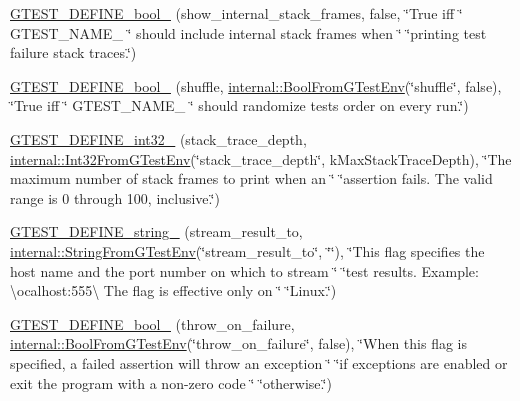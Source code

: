 \begin{DoxyCompactItemize}
\item 
\hyperlink{namespacetesting_a60ef38aa9d1437f0d7818181897af8ef}{G\+T\+E\+S\+T\+\_\+\+D\+E\+F\+I\+N\+E\+\_\+bool\+\_\+} (show\+\_\+internal\+\_\+stack\+\_\+frames, false, \char`\"{}True iff \char`\"{} G\+T\+E\+S\+T\+\_\+\+N\+A\+M\+E\+\_\+ \char`\"{} should include internal stack frames when \char`\"{} \char`\"{}printing test failure stack traces.\char`\"{})
\item 
\hyperlink{namespacetesting_af95276e3deb9d243d729f3043eabd272}{G\+T\+E\+S\+T\+\_\+\+D\+E\+F\+I\+N\+E\+\_\+bool\+\_\+} (shuffle, \hyperlink{namespacetesting_1_1internal_a67132cdce23fb71b6c38ee34ef81eb4c}{internal\+::\+Bool\+From\+G\+Test\+Env}(\char`\"{}shuffle\char`\"{}, false), \char`\"{}True iff \char`\"{} G\+T\+E\+S\+T\+\_\+\+N\+A\+M\+E\+\_\+ \char`\"{} should randomize tests\textquotesingle{} order on every run.\char`\"{})
\item 
\hyperlink{namespacetesting_a84af642630c9181f00fcf0a4a63e795e}{G\+T\+E\+S\+T\+\_\+\+D\+E\+F\+I\+N\+E\+\_\+int32\+\_\+} (stack\+\_\+trace\+\_\+depth, \hyperlink{namespacetesting_1_1internal_a0f7e728793f9e6cb0aa2b69eaa468bf3}{internal\+::\+Int32\+From\+G\+Test\+Env}(\char`\"{}stack\+\_\+trace\+\_\+depth\char`\"{}, k\+Max\+Stack\+Trace\+Depth), \char`\"{}The maximum number of stack frames to print when an \char`\"{} \char`\"{}assertion fails.  The valid range is 0 through 100, inclusive.\char`\"{})
\item 
\hyperlink{namespacetesting_a145c2b7b4242b148b8d167f737b0d7c6}{G\+T\+E\+S\+T\+\_\+\+D\+E\+F\+I\+N\+E\+\_\+string\+\_\+} (stream\+\_\+result\+\_\+to, \hyperlink{namespacetesting_1_1internal_ac54dabc540bf79c2de91add679bfb93b}{internal\+::\+String\+From\+G\+Test\+Env}(\char`\"{}stream\+\_\+result\+\_\+to\char`\"{}, \char`\"{}\char`\"{}), \char`\"{}This flag specifies the host name and the port number on which to stream \char`\"{} \char`\"{}test results. Example\+: \textbackslash{}ocalhost\+:555\textbackslash{} The flag is effective only on \char`\"{} \char`\"{}Linux.\char`\"{})
\item 
\hyperlink{namespacetesting_a7598962574c3fff25237b78f0de81aa7}{G\+T\+E\+S\+T\+\_\+\+D\+E\+F\+I\+N\+E\+\_\+bool\+\_\+} (throw\+\_\+on\+\_\+failure, \hyperlink{namespacetesting_1_1internal_a67132cdce23fb71b6c38ee34ef81eb4c}{internal\+::\+Bool\+From\+G\+Test\+Env}(\char`\"{}throw\+\_\+on\+\_\+failure\char`\"{}, false), \char`\"{}When this flag is specified, a failed assertion will throw an exception \char`\"{} \char`\"{}if exceptions are enabled or exit the program with a non-\/zero code \char`\"{} \char`\"{}otherwise.\char`\"{})

\end{DoxyCompactItemize}
